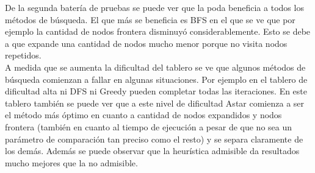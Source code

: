 \documentclass[10pt,journal,compsoc]{IEEEtran}
\begin{document}
De la segunda bater\'ia de pruebas se puede ver que la poda beneficia a todos los m\'etodos de b\'usqueda. El que m\'as se beneficia es BFS en el que se ve que por ejemplo la cantidad de nodos frontera disminuy\'o considerablemente. Esto se debe a que expande una cantidad de nodos mucho menor porque no visita nodos repetidos.\\
A medida que se aumenta la dificultad del tablero se ve que algunos m\'etodos de b\'usqueda comienzan a fallar en algunas situaciones. Por ejemplo en el tablero de dificultad alta ni DFS ni Greedy pueden completar todas las iteraciones. En este tablero tambi\'en se puede ver que a este nivel de dificultad Astar comienza a ser el m\'etodo m\'as \'optimo en cuanto a cantidad de nodos expandidos y nodos frontera (tambi\'en en cuanto al tiempo de ejecuci\'on a pesar de que no sea un par\'ametro de comparaci\'on tan preciso como el resto) y se separa claramente de los dem\'as. Adem\'as se puede observar que la heur\'istica admisible da resultados mucho mejores que la no admisible.



\end{document}
